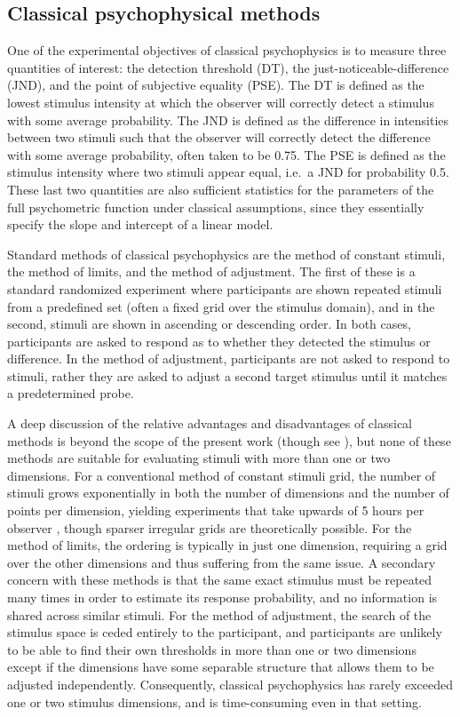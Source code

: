 \documentclass[../main.tex]{subfiles}
\begin{document}
\subsection{Classical psychophysical methods}
One of the experimental objectives of classical psychophysics is to measure three quantities of interest: the
detection threshold (DT),  the just-noticeable-difference (JND), and the point of subjective equality (PSE).
The DT is defined as the lowest stimulus intensity at which the observer will correctly detect a stimulus with
some average probability. The JND is defined as the difference in intensities between two stimuli such that
the observer will correctly detect the difference with some average probability, often
taken to be 0.75. The PSE is defined as the stimulus intensity where two stimuli appear equal, i.e.\ a JND
for probability 0.5. These last two quantities are also sufficient statistics for the parameters of the full psychometric function under classical assumptions, since they essentially specify the slope and intercept of a linear model.

Standard methods of classical psychophysics are the method of constant stimuli, the method of limits, and the method of adjustment. The first of these is a standard randomized experiment where participants are shown repeated stimuli from a predefined set (often a fixed grid over the stimulus domain), and in the second, stimuli are shown in ascending or descending order. In both cases, participants are asked to respond as to whether they detected the stimulus or difference. In the method of adjustment, participants are not asked to respond to stimuli, rather they are asked to adjust a second target stimulus until it matches a predetermined probe.

A deep discussion of the relative advantages and disadvantages of classical methods is beyond the scope of the present work (though see \citet{Klein2001}), but none of these methods are suitable for evaluating stimuli with more than one or two dimensions. For a conventional method of constant stimuli grid, the number of stimuli grows exponentially in both the number of dimensions and the number of points per dimension, yielding experiments that take upwards of 5 hours per observer \citep[e.g.][]{Guan2016,Wier1977}, though sparser irregular grids are theoretically possible. For the method of limits, the ordering is typically in just one dimension, requiring a grid over the other dimensions and thus suffering from the same issue. A secondary concern with these methods is that the same exact stimulus must be repeated many times in order to estimate its response probability, and no information is shared across similar stimuli. For the method of adjustment, the search of the stimulus space is ceded entirely to the participant, and participants are unlikely to be able to find their own thresholds in more than one or two dimensions except if the dimensions have some separable structure that allows them to be adjusted independently. Consequently, classical psychophysics has rarely exceeded one or two stimulus dimensions, and is time-consuming even in that setting.
\end{document}
